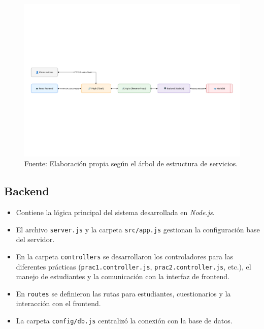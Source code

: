 \documentclass[letter,oneside,12pt,spanish]{report}
\begin{document}
\begin{figure}[ht]
	\centering
	\includegraphics[width=1\textwidth]{Figs/Arquitectura_AVA.pdf}
	\label{fig:AVA}
	\\Fuente: Elaboración propia según el árbol de estructura de servicios.
\end{figure}

\subsection{Backend}
\begin{itemize}
    \item Contiene la lógica principal del sistema desarrollada en \textit{Node.js}.
    \item El archivo \texttt{server.js} y la carpeta \texttt{src/app.js} gestionan la configuración base del servidor.
    \item En la carpeta \texttt{controllers} se desarrollaron los controladores para las diferentes prácticas (\texttt{prac1.controller.js}, \texttt{prac2.controller.js}, etc.), el manejo de estudiantes y la comunicación con la interfaz de frontend.
    \item En \texttt{routes} se definieron las rutas para estudiantes, cuestionarios y la interacción con el frontend.
    \item La carpeta \texttt{config/db.js} centralizó la conexión con la base de datos.
\end{itemize}
\end{document}
